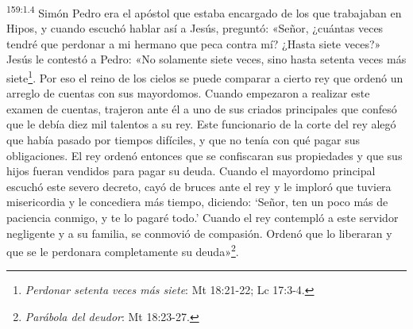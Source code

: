 \par
\textsuperscript{159:1.4} Simón Pedro era el apóstol que estaba encargado de los que trabajaban en Hipos, y cuando escuchó hablar así a Jesús, preguntó: «Señor, ¿cuántas veces tendré que perdonar a mi hermano que peca contra mí? ¿Hasta siete veces?» Jesús le contestó a Pedro: «No solamente siete veces, sino hasta setenta veces más siete\footnote{\textit{Perdonar setenta veces más siete}: Mt 18:21-22; Lc 17:3-4.}. Por eso el reino de los cielos se puede comparar a cierto rey que ordenó un arreglo de cuentas con sus mayordomos. Cuando empezaron a realizar este examen de cuentas, trajeron ante él a uno de sus criados principales que confesó que le debía diez mil talentos a su rey. Este funcionario de la corte del rey alegó que había pasado por tiempos difíciles, y que no tenía con qué pagar sus obligaciones. El rey ordenó entonces que se confiscaran sus propiedades y que sus hijos fueran vendidos para pagar su deuda. Cuando el mayordomo principal escuchó este severo decreto, cayó de bruces ante el rey y le imploró que tuviera misericordia y le concediera más tiempo, diciendo: `Señor, ten un poco más de paciencia conmigo, y te lo pagaré todo.' Cuando el rey contempló a este servidor negligente y a su familia, se conmovió de compasión. Ordenó que lo liberaran y que se le perdonara completamente su deuda»\footnote{\textit{Parábola del deudor}: Mt 18:23-27.}.

